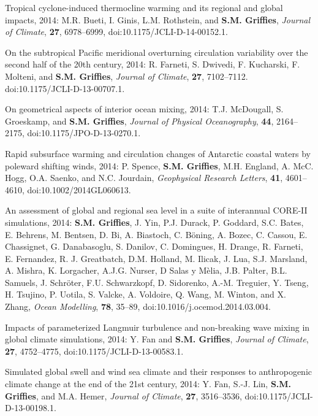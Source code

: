 \begin{etaremune}
\item Tropical cyclone-induced thermocline warming and its regional
  and global impacts, 2014: M.R. Bueti, I. Ginis, L.M. Rothstein, and
  {\bf S.M. Grif\/f\/ies}, {\it Journal of Climate}, {\bf 27},
  6978--6999, doi:10.1175/JCLI-D-14-00152.1.

\item On the subtropical Pacific meridional overturning circulation
  variability over the second half of the 20th century, 2014:
  R. Farneti, S. Dwivedi, F. Kucharski, F. Molteni, and {\bf
    S.M. Grif\/f\/ies}, {\it Journal of Climate}, {\bf 27},
  7102--7112.  doi:10.1175/JCLI-D-13-00707.1.

\item On geometrical aspects of interior ocean mixing, 2014:
  T.J. McDougall, S. Groeskamp, and {\bf S.M. Grif\/f\/ies}, {\it
    Journal of Physical Oceanography}, {\bf 44}, 2164--2175,
  doi:10.1175/JPO-D-13-0270.1.

\item Rapid subsurface warming and circulation changes of Antarctic
  coastal waters by poleward shifting winds, 2014: P. Spence, {\bf
    S.M. Grif\/f\/ies}, M.H. England, A. McC. Hogg, O.A. Saenko, and
  N.C. Jourdain, {\it Geophysical Research Letters}, {\bf 41},
  4601--4610, doi:10.1002/2014GL060613.

\item An assessment of global and regional sea level in a suite of
  interannual CORE-II simulations, 2014: {\bf S.M. Grif\/f\/ies},
  J. Yin, P.J. Durack, P. Goddard, S.C. Bates, E. Behrens, M. Bentsen,
  D. Bi, A. Biastoch, C. B\"oning, A. Bozec, C. Cassou, E. Chassignet,
  G. Danabasoglu, S. Danilov, C. Domingues, H. Drange, R. Farneti,
  E. Fernandez, R. J. Greatbatch, D.M. Holland, M. Ilicak, J. Lua,
  S.J. Marsland, A. Mishra, K. Lorgacher, A.J.G. Nurser, D Salas y
  M\`elia, J.B.  Palter, B.L. Samuels, J. Schr\"oter, F.U. Schwarzkopf, D. Sidorenko, A.-M. Treguier, Y. Tseng,
  H. Tsujino, P. Uotila, S. Valcke, A. Voldoire, Q. Wang, M. Winton,
  and X. Zhang, {\it Ocean Modelling}, {\bf 78}, 35--89,
  doi:10.1016/j.ocemod.2014.03.004.

\item Impacts of parameterized Langmuir turbulence and non-breaking
  wave mixing in global climate simulations, 2014: Y. Fan and {\bf
    S.M. Grif\/f\/ies}, {\it Journal of Climate}, {\bf 27},
  4752--4775, doi:10.1175/JCLI-D-13-00583.1.

\item Simulated global swell and wind sea climate and their responses
  to anthropogenic climate change at the end of the 21st century,
  2014: Y. Fan, S.-J. Lin, {\bf S.M. Grif\/f\/ies}, and M.A. Hemer,
  {\it Journal of Climate}, {\bf 27}, 3516--3536,
  doi:10.1175/JCLI-D-13-00198.1.


\end{etaremune}
